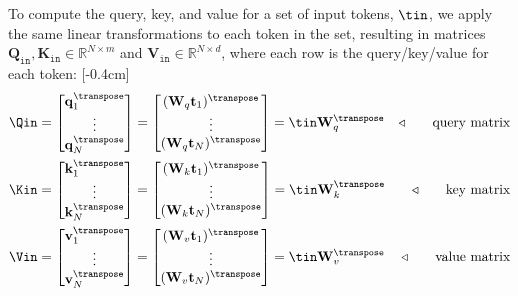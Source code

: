 To compute the query, key, and value for a set of input tokens, $\tin$, we apply the same linear transformations to each token in the set, resulting in matrices $\mathbf{Q}_{\texttt{in}}, \mathbf{K}_{\texttt{in}} \in \mathbb{R}^{N \times m}$ and $\mathbf{V}_{\texttt{in}} \in \mathbb{R}^{N \times d}$, where each row is the query/key/value for each token:
[-0.4cm]
\begin{align}
    \Qin &= 
     \begin{bmatrix}
        \mathbf{q}_1^\transpose\\
        \vdots \\
        \mathbf{q}_N^\transpose\\
    \end{bmatrix} 
    = 
    \begin{bmatrix}
        (\mathbf{W}_q \mathbf{t}_1)^\transpose\\
        \vdots \\
        (\mathbf{W}_q \mathbf{t}_N)^\transpose\\
    \end{bmatrix} 
    = \tin\mathbf{W}_q^\transpose &\triangleleft \quad\quad \text{query matrix} \label{eqn:transformers:query_matrix}\\
    \Kin &= 
     \begin{bmatrix}
        \mathbf{k}_1^\transpose\\
        \vdots \\
        \mathbf{k}_N^\transpose\\
    \end{bmatrix} 
    = 
    \begin{bmatrix}
        (\mathbf{W}_k \mathbf{t}_1)^\transpose\\
        \vdots \\
        (\mathbf{W}_k \mathbf{t}_N)^\transpose\\
    \end{bmatrix} 
    = \tin\mathbf{W}_k^\transpose &\triangleleft \quad\quad \text{key matrix}\\
    \Vin &= 
     \begin{bmatrix}
        \mathbf{v}_1^\transpose\\
        \vdots \\
        \mathbf{v}_N^\transpose\\
    \end{bmatrix} 
    = 
    \begin{bmatrix}
        (\mathbf{W}_v \mathbf{t}_1)^\transpose\\
        \vdots \\
        (\mathbf{W}_v \mathbf{t}_N)^\transpose\\
    \end{bmatrix} 
    = \tin\mathbf{W}_v^\transpose &\triangleleft \quad\quad \text{value matrix}
\end{align}

